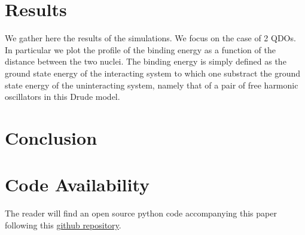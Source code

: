 \documentclass[reprint, amsmath, amssymb, aps]{revtex4-2}
\begin{document}
\section{Results}
    We gather here the results of the simulations. We focus on the case of 2 QDOs. In particular we plot the profile of the binding energy as a function of the distance between the two nuclei. The binding energy is simply defined as the ground state energy of the interacting system to which one substract the ground state energy of the uninteracting system, namely that of a pair of free harmonic oscillators in this Drude model.



\section{Conclusion}

\begin{acknowledgments}

\end{acknowledgments}

\section*{Code Availability}

The reader will find an open source python code accompanying this paper following this \href{https://github.com/MatthieuSarkis/qdo}{github repository}.

\appendix

\nocite{*}


\end{document}
